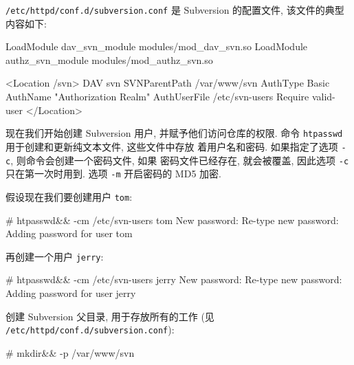 \documentclass[nofonts, oneside]{ctexart}
\newcommand\shellcmd[1]{\texttt{#1}}
\begin{document}
\texttt{/etc/httpd/conf.d/subversion.conf} 是 Subversion
的配置文件, 该文件的典型内容如下:
\begin{svnshell}
LoadModule dav_svn_module   modules/mod_dav_svn.so
LoadModule authz_svn_module modules/mod_authz_svn.so

<Location /svn>
    DAV svn
    SVNParentPath /var/www/svn
    AuthType Basic
    AuthName "Authorization Realm"
    AuthUserFile /etc/svn-users
    Require valid-user
</Location>
\end{svnshell}

现在我们开始创建 Subversion 用户, 并赋予他们访问仓库的权限. 命令
\shellcmd{htpasswd} 用于创建和更新纯文本文件,
这些文件中存放
着用户名和密码. 如果指定了选项 \shellcmd{-c}, 则命令会创建一个密码文件, 如果
密码文件已经存在, 就会被覆盖, 因此选项 \shellcmd{-c} 只在第一次时用到. 选项
\shellcmd{-m} 开启密码的 MD5 加密.

假设现在我们要创建用户 \texttt{tom}:
\begin{svnshell}
# htpasswd&& -cm /etc/svn-users tom
New password:
Re-type new password:
Adding password for user tom
\end{svnshell}

再创建一个用户 \texttt{jerry}:
\begin{svnshell}
# htpasswd&& -cm /etc/svn-users jerry
New password:
Re-type new password:
Adding password for user jerry
\end{svnshell}

创建 Subversion 父目录, 用于存放所有的工作  (见
\texttt{/etc/httpd/conf.d/subversion.conf}):
\begin{svnshell}
# mkdir&& -p /var/www/svn
\end{svnshell}
\end{document}
